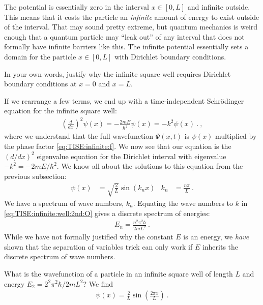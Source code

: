 \documentclass[12pt, oneside]{report}    %
\begin{document}
The potential is essentially zero in the interval $x\in[0,L]$ and infinite outside. This means that it costs the particle an \emph{infinite} amount of energy to exist outside of the interval. That may sound pretty extreme, but quantum mechanics is weird enough that a quantum particle may ``leak out'' of any interval that does not formally have infinite barriers like this. The infinite potential essentially sets a domain for the particle $x\in[0,L]$ with Dirichlet boundary conditions. 
\begin{exercise}
In your own words, justify why the infinite square well requires Dirichlet boundary conditions at $x=0$ and $x=L$.
\end{exercise}

If we rearrange a few terms, we end up with a time-independent Schr\"odinger equation for the infinite square well:
\begin{align}
    \left(\frac{d}{dx}\right)^2 \psi(x) = -\frac{2mE}{\hbar^2}\psi(x) 
    = - k^2 \psi(x) \ .
    \ ,
    \label{eq:TISE:infinite:well:2nd:O}
\end{align}
where we understand that the full wavefunction $\Psi(x,t)$ is $\psi(x)$ multiplied by the phase factor \eqref{eq:TISE:infinite:f}. We now see that our equation is the $(d/dx)^2$ eigenvalue equation for the Dirichlet interval with eigenvalue $-k^2 = -2mE/\hbar^2$. We know all about the solutions to this equation from the previous subsection:
\begin{align}
    \psi(x) &= \sqrt{\frac{2}{L}} \sin(k_n x)
    &
    k_n &= \frac{n\pi}{L} \ .
\end{align}
We have a spectrum of wave numbers, $k_n$. Equating the wave numbers to $k$ in \eqref{eq:TISE:infinite:well:2nd:O} gives a discrete spectrum of energies:
\begin{align}
    E_n = \frac{n^2 \pi^2 \hbar}{2mL^2} \ .
\end{align}
While we have not formally justified why the constant $E$ is an energy, we \emph{have} shown that the separation of variables trick can only work if $E$ inherits the discrete spectrum of wave numbers. 

\begin{example} What is the wavefunction of a particle in an infinite square well of length $L$ and energy $E_2 =  2^2 \pi^2 \hbar / 2mL^2$? We find
\begin{align}
    \psi(x) = \frac{2}{L} \sin\left(\frac{2\pi x}{L}\right) \ .
\end{align}

\end{example}
\end{document}
